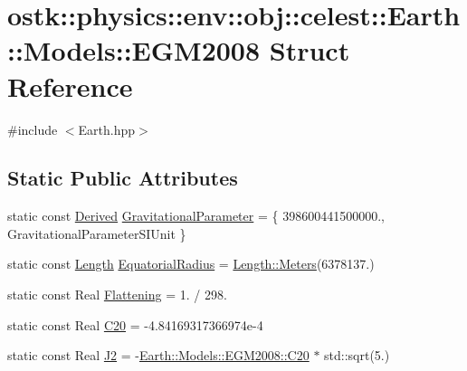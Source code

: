 \hypertarget{structostk_1_1physics_1_1env_1_1obj_1_1celest_1_1_earth_1_1_models_1_1_e_g_m2008}{}\section{ostk\+:\+:physics\+:\+:env\+:\+:obj\+:\+:celest\+:\+:Earth\+:\+:Models\+:\+:E\+G\+M2008 Struct Reference}
\label{structostk_1_1physics_1_1env_1_1obj_1_1celest_1_1_earth_1_1_models_1_1_e_g_m2008}


{\ttfamily \#include $<$Earth.\+hpp$>$}

\subsection*{Static Public Attributes}
\begin{DoxyCompactItemize}
\item 
static const \hyperlink{classostk_1_1physics_1_1units_1_1_derived}{Derived} \hyperlink{structostk_1_1physics_1_1env_1_1obj_1_1celest_1_1_earth_1_1_models_1_1_e_g_m2008_a8394121b23869f652327020d5fbe52f2}{Gravitational\+Parameter} = \{ 398600441500000., Gravitational\+Parameter\+S\+I\+Unit \}
\item 
static const \hyperlink{classostk_1_1physics_1_1units_1_1_length}{Length} \hyperlink{structostk_1_1physics_1_1env_1_1obj_1_1celest_1_1_earth_1_1_models_1_1_e_g_m2008_aeaa20c721a95aae876511d40775ee33f}{Equatorial\+Radius} = \hyperlink{classostk_1_1physics_1_1units_1_1_length_ad227977ce00756791595796a0dd5ddd7}{Length\+::\+Meters}(6378137.)
\item 
static const Real \hyperlink{structostk_1_1physics_1_1env_1_1obj_1_1celest_1_1_earth_1_1_models_1_1_e_g_m2008_a6ed7cbe4ce3546964d454bac1829f50c}{Flattening} = 1. / 298.
\item 
static const Real \hyperlink{structostk_1_1physics_1_1env_1_1obj_1_1celest_1_1_earth_1_1_models_1_1_e_g_m2008_a0f6ab7acf82079be89804e6b0eb28482}{C20} = -\/4.\+84169317366974e-\/4
\item 
static const Real \hyperlink{structostk_1_1physics_1_1env_1_1obj_1_1celest_1_1_earth_1_1_models_1_1_e_g_m2008_a997d91f4530dc39664b7795868754382}{J2} = -\/\hyperlink{structostk_1_1physics_1_1env_1_1obj_1_1celest_1_1_earth_1_1_models_1_1_e_g_m2008_a0f6ab7acf82079be89804e6b0eb28482}{Earth\+::\+Models\+::\+E\+G\+M2008\+::\+C20} $\ast$ std\+::sqrt(5.)
\end{DoxyCompactItemize}


